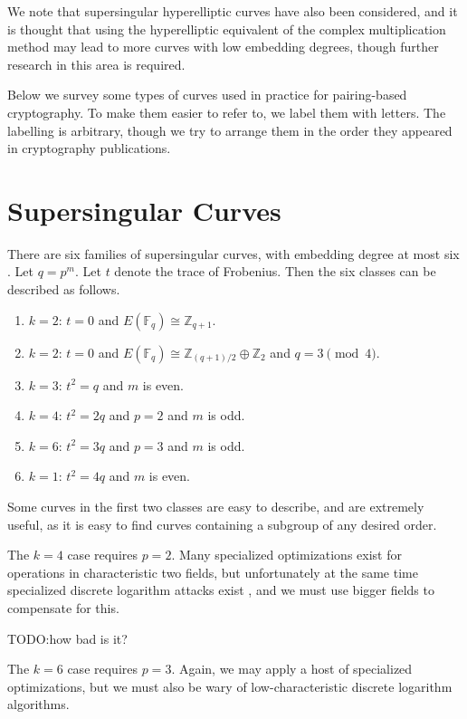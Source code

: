 We note that supersingular hyperelliptic curves have also been considered,
and it is thought that using the hyperelliptic equivalent of the
complex multiplication method may lead to more curves with low
embedding degrees, though further research in this area is required.

Below we survey some types of curves used in practice for pairing-based
cryptography. To make them easier to refer to, we label them with letters.
The labelling is arbitrary, though we try to arrange them in the order
they appeared in cryptography publications.

\section {Supersingular Curves}

There are six families of supersingular curves, with embedding degree at
most six \cite{mov}. Let $q=p^m$. Let $t$ denote the trace of Frobenius.
Then the six classes can be described as follows.

\begin{enumerate}
\item
$k = 2$: $ t = 0$ and $E(\mathbb{F}_q) \cong \mathbb{Z}_{q+1}$.
\item
$k = 2$: $ t = 0$ and $E(\mathbb{F}_q) \cong \mathbb{Z}_{(q+1)/2} \oplus \mathbb{Z}_2$ and $q = 3 \pmod{4}$.
\item
$k = 3$: $ t^2 = q$ and $m$ is even.
\item
$k = 4$: $ t^2 = 2q$ and $p = 2$ and $m$ is odd.
\item
$k = 6$: $ t^2 = 3q$ and $p = 3$ and $m$ is odd.
\item
$k = 1$: $ t^2 = 4q$ and $m$ is even.
\end{enumerate}

Some curves in the first two classes are easy to describe, and are
extremely useful, as it is easy to find curves containing a
subgroup of any desired order.

The $k=4$ case requires $p=2$.
Many specialized optimizations exist for
operations in characteristic two fields,
but unfortunately at the same time specialized discrete logarithm attacks
exist \cite{coppersmith}, and we must use bigger fields to compensate for
this. 

TODO:how bad is it?

The $k=6$ case requires $p=3$. Again, we may apply
a host of specialized optimizations, but we must also be wary of
low-characteristic discrete logarithm algorithms.

